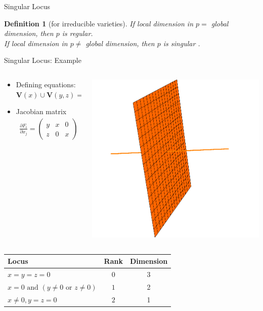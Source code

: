 \documentclass[notes=hide]{beamer}
\newtheorem{defn}{Definition}
\newcommand{\V}{\mathbf{V}}
\begin{document}
\begin{frame}{Singular Locus}
\begin{defn}[for irreducible varieties]
If local dimension in $p = $ global dimension, then $p $ is regular.\\
If local dimension in $p \neq$ global dimension, then $p$ is singular .
\end{defn}
\end{frame}

\begin{frame}{Singular Locus: Example}
\begin{columns}[onlytextwidth]
	\begin{column}{0.6\textwidth}
	\begin{itemize}[<+->]
	\item Defining equations: $\V (x) \cup \V (y,z) = \V (xy,xz)$
	\item Jacobian matrix
		\begin{align*}
		\frac{\partial F_i}{\partial x_j} = \begin{pmatrix}	y & x & 0 \\ z & 0 & x	\end{pmatrix}
		\end{align*}
	\end{itemize}
	\end{column}
	\begin{column}{0.4\textwidth}
	\includegraphics[width=\textwidth]{varietiesNotConstDim}
	\end{column}
\end{columns}
\pause
\begin{center}
\begin{tabular}{l | c | c}
		Locus & Rank & Dimension\\
		\toprule
		$x=y=z=0$  & $0$ & 3\\
		\midrule
		$x=0 \text{ and } (y\neq 0 \text{ or } z \neq 0)$ & $1$ & 2\\
		\midrule
		$x\neq 0, y=z=0$ & $2$ & 1\\
		\bottomrule
\end{tabular}
\end{center}


\end{frame}
\end{document}
